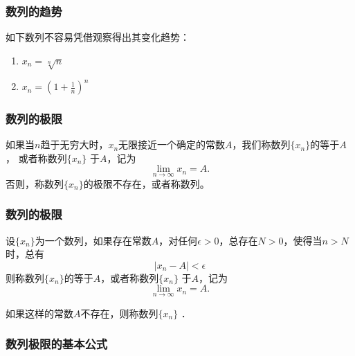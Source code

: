 \documentclass[14pt,notheorems,leqno,xcolor={rgb}]{beamer} %
\begin{document}
\begin{iframe}
\frametitle{数列的趋势}
\begin{example*}
如下数列不容易凭借观察得出其变化趋势：
\begin{enumerate}
  \item $x_n = \sqrt[n]{n}$
  \item $x_n = \left(1+\frac1n\right)^n$
\end{enumerate}
\end{example*}
\end{iframe}

\begin{oframe}
\frametitle{数列的极限}
\begin{definition*}
如果当$n$趋于无穷大时，$x_n$无限接近一个确定的常数$A$，我们称数列$\{x_n\}$的等于$A$，
或者称数列$\{x_n\}$ 于$A$，记为
\[ \lim_{n\to\infty}x_n=A. \]
否则，称数列$\{x_n\}$的极限不存在，或者称数列。
\end{definition*}
\end{oframe}

\begin{iframe}
\frametitle{数列的极限}
\begin{definition}
设$\{x_n\}$为一个数列，如果存在常数$A$，对任何$\epsilon>0$，总存在$N>0$，使得当$n>N$时，总有
\[ |x_n-A|<\epsilon \]
则称数列$\{x_n\}$的等于$A$，或者称数列$\{x_n\}$ 于$A$，记为
\[ \lim_{n\to\infty}x_n=A. \]
\end{definition}
如果这样的常数$A$不存在，则称数列$\{x_n\}$ ．
\end{iframe}

\begin{frame}
\frametitle{数列极限的基本公式}
\noindent{}
\end{frame}
\end{document}
